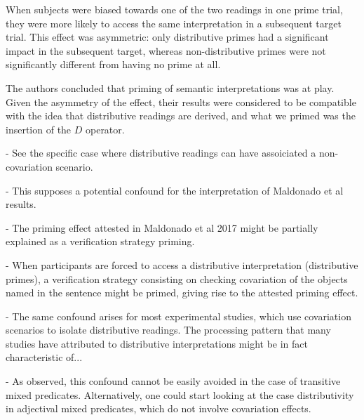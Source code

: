 When subjects were biased towards one of the two readings in one prime trial, they were more likely to access the same interpretation in a subsequent target trial. This effect was asymmetric: only distributive primes had a significant impact in the subsequent target, whereas non-distributive primes were not  significantly different from having no prime at all.  

The authors concluded that priming of semantic interpretations was at play. Given the asymmetry of the effect, their results were considered to be compatible with the idea that distributive readings are derived, and what we primed was the insertion of the $D$ operator.

- See the specific case where distributive readings can have assoiciated a non-covariation scenario. 

- This supposes a potential confound for the interpretation of Maldonado et al results.

- The priming effect attested in Maldonado et al 2017 might be partially explained as a verification strategy priming. 

- When participants are forced to access a distributive interpretation (distributive primes), a verification strategy consisting on checking covariation of the objects named in the sentence might be primed, giving rise to the attested priming effect. 



- The same confound arises for most experimental studies, which use covariation scenarios to isolate distributive readings. The processing pattern that many studies have attributed to distributive interpretations might be in fact characteristic of... 

- As observed, this confound cannot be easily avoided in the case of transitive mixed predicates. Alternatively, one could start looking at the case distributivity in adjectival mixed predicates, which do not involve covariation effects. 



